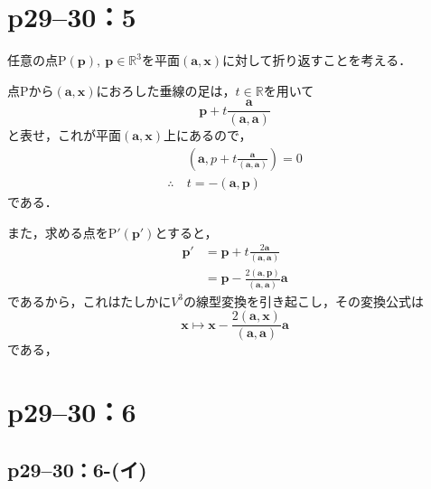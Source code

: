 \documentclass[a4paper,10pt,fleqn]{ltjsarticle}
\begin{document}
\section*{p29--30：5}

\begin{tleftbar}
  任意の点$\mathrm{P}(\bm{p}),~\bm{p} \in \mathbb{R}^3$を平面$(\bm{a},\bm{x})$に対して折り返すことを考える．

  点$\mathrm{P}$から$(\bm{a},\bm{x})$におろした垂線の足は，$t \in \mathbb{R}$を用いて
  \[
    \bm{p} + t \frac{\bm{a}}{(\bm{a},\bm{a})}
  \]
  と表せ，これが平面$(\bm{a},\bm{x})$上にあるので，
  \begin{align*}
                 & (\bm{a},p+t\frac{\bm{a}}{(\bm{a},\bm{a})})=0 \\
    \therefore ~ & t=- (\bm{a},\bm{p})
  \end{align*}
  である．

  また，求める点を$\mathrm{P}' (\bm{p}')$とすると，
  \begin{align*}
    \bm{p}' & = \bm{p}+t \frac{2\bm{a}}{(\bm{a},\bm{a})}               \\
            & = \bm{p}-\frac{2(\bm{a},\bm{p})}{(\bm{a},\bm{a})} \bm{a}
  \end{align*}
  であるから，これはたしかに$V^3$の線型変換を引き起こし，その変換公式は
  \[
    \bm{x} \mapsto \bm{x}-\frac{2(\bm{a},\bm{x})}{(\bm{a},\bm{a})} \bm{a}
  \]
  である，
\end{tleftbar}

\newpage

\section*{p29--30：6}

\subsection*{p29--30：6-(イ)}
\end{document}
